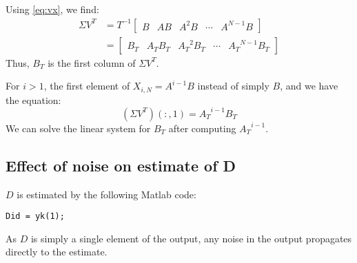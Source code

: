 \documentclass[11pt,a4paper]{article}
\begin{document}
Using \autoref{eq:vx}, we find:
\begin{align}
    \Sigma V^T &= T^{-1} \begin{bmatrix}
        B & AB & A^2B & \cdots & A^{N-1}B \end{bmatrix} \\
    &= \begin{bmatrix}
        B_T & A_TB_T & {A_T}^2B_T & \cdots & {A_T}^{N-1}B_T \end{bmatrix}
\end{align}
Thus, $B_T$ is the first column of $\Sigma V^T$.

For $i > 1$, the first element of $X_{i, N} = A^{i - 1}B$ instead of simply
$B$, and we have the equation:
\begin{equation}
    (\Sigma V^T)(:, 1) = {A_T}^{i - 1}B_T
\end{equation}
We can solve the linear system for $B_T$ after computing ${A_T}^{i-1}$.

\subsection{Effect of noise on estimate of D}
$D$ is estimated by the following Matlab code:
\begin{lstlisting}
Did = yk(1);
\end{lstlisting}
As $D$ is simply a single element of the output, any noise in the output
propagates directly to the estimate.
\end{document}
